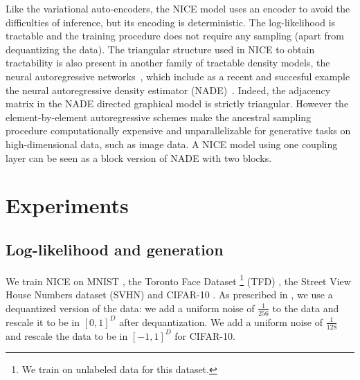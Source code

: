 \documentclass{article}
\begin{document}
Like the variational auto-encoders, the NICE model uses an encoder to avoid
the difficulties of inference, but its encoding is deterministic. The log-likelihood is tractable and the training procedure does not require any sampling (apart from dequantizing the data). 
The triangular structure used in NICE to obtain tractability is also present in another family of tractable density models, the
neural autoregressive networks~\citep{Bengio+Bengio-NIPS99}, which include as a recent and succesful example the
neural autoregressive density estimator (NADE)~\citep{Larochelle+Murray-2011}.
Indeed, the adjacency matrix in the
NADE directed graphical model is strictly triangular. However the
element-by-element autoregressive schemes make the ancestral sampling procedure computationally
expensive and unparallelizable for generative tasks on high-dimensional data, such as image data.
A NICE model using one coupling layer can be seen as a block version of NADE with two blocks.


\section{Experiments}
\subsection{Log-likelihood and generation}
We train NICE on MNIST \citep{lecun1998mnist}, the Toronto Face Dataset
\footnote{We train on unlabeled data for this dataset.}
(TFD) \citep{Susskind2010}, the Street View House Numbers dataset (SVHN)
\citep{Netzer-wkshp-2011} and CIFAR-10 \citep{Krizhevsky2010tr}. As
prescribed in \citep{Benigno-et-al-NIPS2013-small}, 
we use a dequantized version of the data: we add a uniform noise of $\frac{1}{256}$ to the data and
rescale it to be in $[0,1]^{D}$ after dequantization. We add a uniform noise of $\frac{1}{128}$
and rescale the data to be in $[-1,1]^{D}$ for CIFAR-10.
\end{document}
